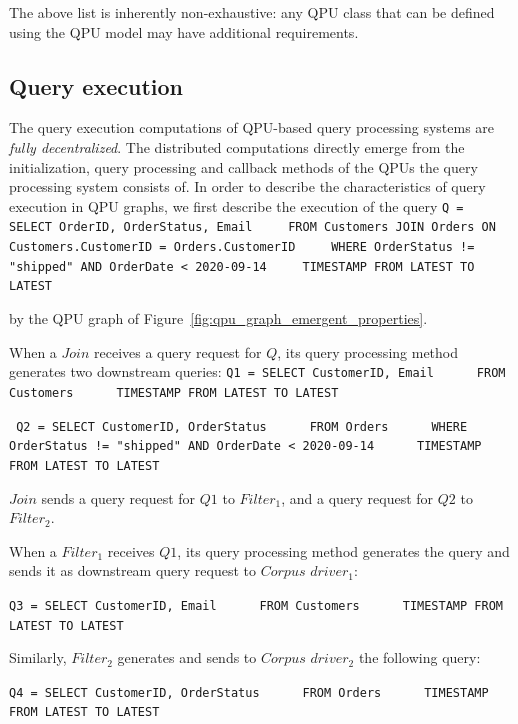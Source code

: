 The above list is inherently non-exhaustive:
any QPU class that can be defined using the QPU model may have additional requirements.

\subsection{Query execution}
\label{sec:computation_model}

The query execution computations of QPU-based query processing systems are \textit{fully decentralized}.
The distributed computations directly emerge from the initialization, query processing and callback methods of the QPUs
the query processing system consists of.
In order to describe the characteristics of query execution in QPU graphs, we first describe the execution of the query
{\obeylines\obeyspaces
\texttt{Q = SELECT OrderID, OrderStatus, Email
        ~~~~FROM Customers JOIN Orders ON Customers.CustomerID = Orders.CustomerID
        ~~~~WHERE OrderStatus != "shipped" AND OrderDate < 2020-09-14
        ~~~~TIMESTAMP FROM LATEST TO LATEST
        }}

by the QPU graph of Figure~\ref{fig:qpu_graph_emergent_properties}.

When a $Join$ receives a query request for $Q$, its query processing method generates two downstream queries:
{\obeylines\obeyspaces
\texttt{Q1 = SELECT CustomerID, Email
        ~~~~~FROM Customers
        ~~~~~TIMESTAMP FROM LATEST TO LATEST
        }}

{\obeylines\obeyspaces
\texttt{
        Q2 = SELECT CustomerID, OrderStatus
        ~~~~~FROM Orders
        ~~~~~WHERE OrderStatus != "shipped" AND OrderDate < 2020-09-14
        ~~~~~TIMESTAMP FROM LATEST TO LATEST
        }}

$Join$ sends a query request for $Q1$ to $Filter_1$, and a query request for $Q2$ to $Filter_2$.

When a $Filter_1$ receives $Q1$, its query processing method generates the query and sends it as downstream query request
to $Corpus$ $driver_1$:

{\obeylines\obeyspaces
\texttt{Q3 = SELECT CustomerID, Email
        ~~~~~FROM Customers
        ~~~~~TIMESTAMP FROM LATEST TO LATEST
        }}

Similarly, $Filter_2$ generates and sends to $Corpus$ $driver_2$ the following query:

{\obeylines\obeyspaces
\texttt{Q4 = SELECT CustomerID, OrderStatus
        ~~~~~FROM Orders
        ~~~~~TIMESTAMP FROM LATEST TO LATEST
        }}

